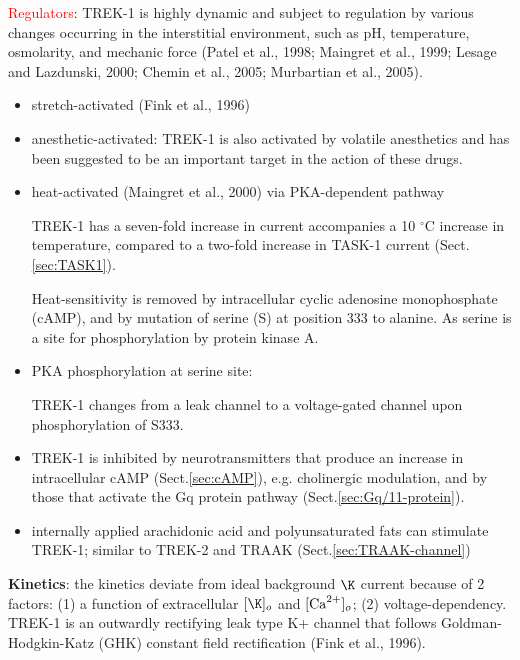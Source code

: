 \textcolor{red}{Regulators}: TREK-1 is highly dynamic and subject to regulation
by various changes occurring in the interstitial environment, such as pH,
temperature, osmolarity, and mechanic force (Patel et al., 1998; Maingret et
al., 1999; Lesage and Lazdunski, 2000; Chemin et al., 2005; Murbartian et al.,
2005).
\begin{itemize}
  \item stretch-activated (Fink et al., 1996)

   \item anesthetic-activated:  TREK-1 is also activated by volatile anesthetics
   and has been suggested to be an important target in the action of these
   drugs.
  
  \item heat-activated (Maingret et al., 2000) via PKA-dependent pathway
  
TREK-1 has a seven-fold increase in current accompanies a 10 $^\circ$C increase
in temperature, compared to a two-fold increase in TASK-1 current
(Sect.\ref{sec:TASK1}).

Heat-sensitivity is removed by intracellular cyclic adenosine monophosphate
(cAMP), and by mutation of serine (S) at position 333 to alanine.
As serine is a site for phosphorylation by protein kinase A.

   \item PKA phosphorylation at serine site: 
   
   TREK-1 changes from a leak channel to a voltage-gated channel upon
   phosphorylation of S333.
   
 
   \item  TREK-1 is inhibited by neurotransmitters that produce an increase in
intracellular cAMP (Sect.\ref{sec:cAMP}), e.g. cholinergic modulation, and by
those that activate the Gq protein pathway (Sect.\ref{sec:Gq/11-protein}).

  \item internally applied arachidonic acid and polyunsaturated fats can
  stimulate TREK-1; similar to TREK-2 and TRAAK (Sect.\ref{sec:TRAAK-channel})

\end{itemize}

{\bf Kinetics}: the kinetics deviate from ideal background $\K$ current because
of 2 factors: (1) a function of extracellular $[\K]_o$ and $[{\text{Ca}^{2+}}]_o$; (2)
voltage-dependency. TREK-1 is an outwardly rectifying leak type
K+ channel that follows Goldman-Hodgkin-Katz (GHK) constant field rectification
(Fink et al., 1996). 

